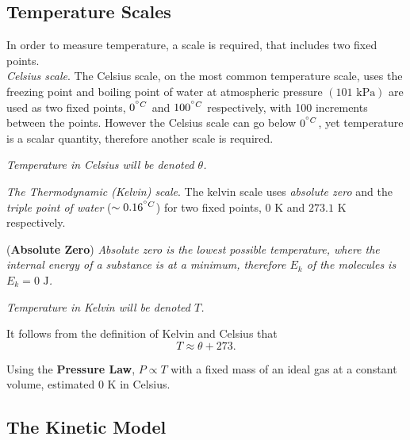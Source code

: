 \subsection{Temperature Scales}

In order to measure temperature, a scale is required, that includes two fixed points.\\

\noindent \textit{Celsius scale}. The Celsius scale, on the most common temperature scale, uses the freezing point and boiling point of water at atmospheric pressure $(101 \textrm{ kPa})$ are used as two fixed points, $0^{\degree C}$ and $100^{\degree C}$ respectively, with 100 increments between the points. However the Celsius scale can go below $0^{\degree C}$, yet temperature is a scalar quantity, therefore another scale is required.

\begin{notation}
\textit{Temperature in Celsius will be denoted $\theta$.}
\end{notation}

\noindent \textit{The Thermodynamic (Kelvin) scale}. The kelvin scale uses \textit{absolute zero} and the \textit{triple point of water} ($\sim  0.16^{\degree C}$) for two fixed points, $0 \textrm{ K}$ and $273.1 \textrm{ K}$ respectively.

\begin{definition}{(\textbf{Absolute Zero})}
\textit{Absolute zero is the lowest possible temperature, where the internal energy of a substance is at a minimum, therefore $E_k$ of the molecules is $E_k = 0 \textrm{ J}$.}
\end{definition}
\begin{notation}
\textit{Temperature in Kelvin will be denoted $T$.}
\end{notation}
\noindent It follows from the definition of Kelvin and Celsius that
\begin{equation}
    T \approx \theta + 273.
\end{equation}

\begin{experiment}
Using the \textbf{Pressure Law}, $P \propto T$ with a fixed mass of an ideal gas at a constant volume, estimated $0 \textrm{ K}$ in Celsius. 
\end{experiment}

\subsection{The Kinetic Model}
\label{subsection:kinetic-model}

